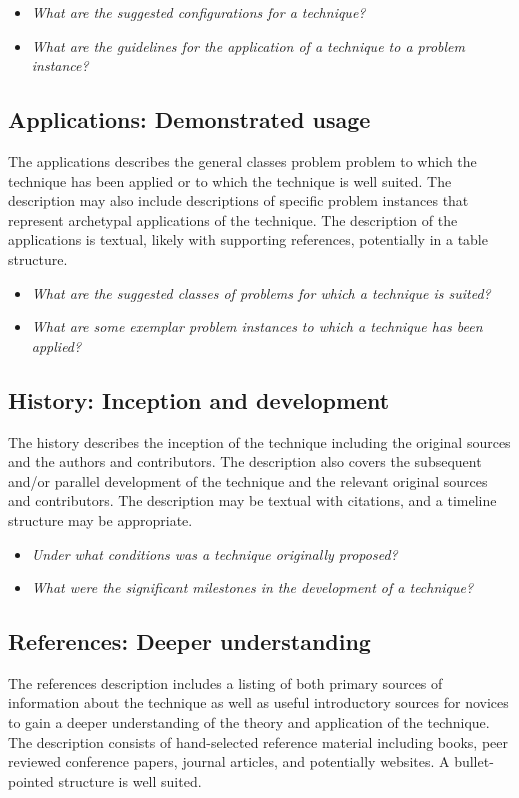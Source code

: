\documentclass[a4paper, 11pt]{article}
\begin{document}
\begin{itemize}
	\item \emph{What are the suggested configurations for a technique?}
	\item \emph{What are the guidelines for the application of a technique to a problem instance?}
\end{itemize}

\subsection{Applications: Demonstrated usage}
The applications describes the general classes problem problem to which the technique has been applied or to which the technique is well suited. The description may also include descriptions of specific problem instances that represent archetypal applications of the technique. The description of the applications is textual, likely with supporting references, potentially in a table structure. 

\begin{itemize}
	\item \emph{What are the suggested classes of problems for which a technique is suited?}
	\item \emph{What are some exemplar problem instances to which a technique has been applied?}
\end{itemize}

\subsection{History: Inception and development}
The history describes the inception of the technique including the original sources and the authors and contributors. The description also covers the subsequent and/or parallel development of the technique and the relevant original sources and contributors. The description may be textual with citations, and a timeline structure may be appropriate.

\begin{itemize}
	\item \emph{Under what conditions was a technique originally proposed?}
	\item \emph{What were the significant milestones in the development of a technique?}
\end{itemize}

\subsection{References: Deeper understanding}
The references description includes a listing of both primary sources of information about the technique as well as useful introductory sources for novices to gain a deeper understanding of the theory and application of the technique. The description consists of hand-selected reference material including books, peer reviewed conference papers, journal articles, and potentially websites. A bullet-pointed structure is well suited. 
\end{document}
